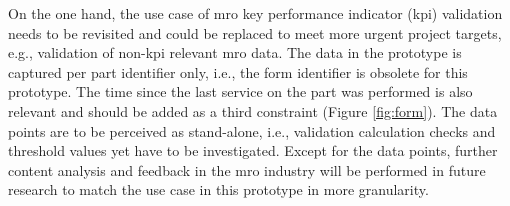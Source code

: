 On the one hand, the use case of \acrshort{mro} key performance indicator (\acrshort{kpi}) validation needs to be revisited and could be replaced to meet more urgent project targets, e.g., validation of non-\acrshort{kpi} relevant \acrshort{mro} data. The data in the prototype is captured per part identifier only, i.e., the form identifier is obsolete for this prototype. The time since the last service on the part was performed is also relevant and should be added as a third constraint (Figure \ref{fig:form}). The data points are to be perceived as stand-alone, i.e., validation calculation checks and threshold values yet have to be investigated. Except for the data points, further content analysis and feedback in the \acrshort{mro} industry will be performed in future research to match the use case in this prototype in more granularity.

